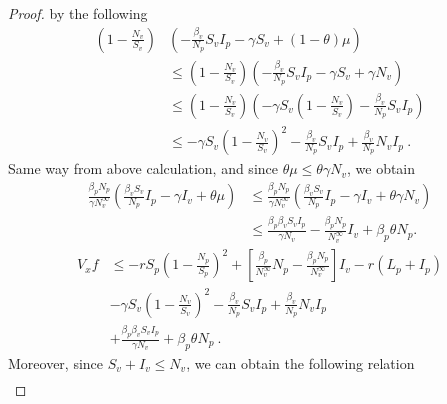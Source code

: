 \begin{proof}
	by the following
	\begin{equation}\label{theorem2term2}
		\begin{aligned}
			\left(
				1 - 
				\frac{N_v}{S_v}
			\right)
			&
			\left(
				-\frac{\beta_v}{N_p} S_v I_p - 
				\gamma S_v + 
				(1 - \theta) \mu 
			\right) 
			\\
			&
			\leq
				\left(
					1 - \frac{N_v}{S_v}
				\right)
				\left(- 
					\frac{\beta_v}{N_p} S_v I_p -
					\gamma S_v +\gamma N_v
				\right)
			\\
			&\leq
				\left(
					1 - \frac{N_v}{S_v}
				\right)
				\left(-
					\gamma S_v
					\left(
						1 - 
						\frac{N_v}{S_v}
					\right) -
					\frac{\beta_v}{N_p} S_v I_p
				\right)
			\\
			&\leq
				-\gamma S_v 
				\left(
					1- 
					\frac{N_v}{S_v}
				\right) ^ 2 - 
				\frac{\beta_v}{N_p} S_v I_p + 
				\frac{\beta_v}{N_p} N_v I_p \ .
		\end{aligned}
	\end{equation}
	Same way from above calculation, and since 
	$\theta \mu\leq \theta\gamma N_v$, we obtain
	\begin{equation}
		\label{theorem2term3}
		\begin{aligned}
			\frac{\beta_p N_p}{\gamma N^\infty_v}
			\left(
				\frac{\beta_v S_v}{N_p} I_p- 
				\gamma I_v + \theta \mu
			\right)
			&\leq
				\frac{\beta_p N_p}{\gamma N^\infty_v}
				\left(
					\frac{\beta_v S_v}{N_p} I_p -
					\gamma I_v + 
					\theta \gamma N_v
				\right) 
			\\
			&\leq
				\frac{\beta_p \beta_v S_v I_p}{\gamma N_v} - 
				\frac{\beta_p N_p}{ N^\infty_v} I_v + 
				\beta_p \theta N_p.
		\end{aligned}
	\end{equation}
	\begin{align*}
		V_x f 
			& \leq
				- r S_p 
				\left(
					1 - 
					\frac{N_p}{S_p}
				\right) ^ 2 + 
				\left[
					\frac{\beta_p}{N^\infty_v} N_p - 
					\frac{\beta_p N_p}{ N^\infty_v}
				\right] I_v - 
				r (L_p + I_p)
			\\
				& -
				\gamma S_v
				\left(
					1 - 
					\frac{N_v}{S_v}
				\right) ^ 2 - 
				\frac{\beta_v}{N_p} S_v I_p + 
				\frac{\beta_v}{N_p} N_v I_p
			\\
				& +
				\frac{\beta_p\beta_v S_v I_p}{\gamma N_v} + 
				\beta_p \theta N_p \ .
	\end{align*}
	Moreover, since $S_v+I_v\leq N_v$, we can obtain the following relation
	\begin{align*}

\end{align*}
\end{proof}
